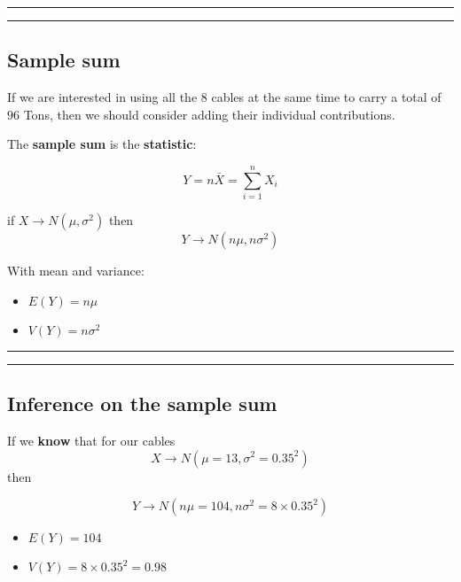 \documentclass[
]{book}
\providecommand{\tightlist}{%
  \setlength{\itemsep}{0pt}\setlength{\parskip}{0pt}}
\begin{document}
\begin{center}\rule{0.5\linewidth}{0.5pt}\end{center}

\begin{center}\rule{0.5\linewidth}{0.5pt}\end{center}

\hypertarget{sample-sum}{%
\subsection{Sample sum}\label{sample-sum}}

If we are interested in using all the \(8\) cables at the same time to carry a total of \(96\) Tons, then we should consider adding their individual contributions.

The \textbf{sample sum} is the \textbf{statistic}:

\[Y=n \bar{X}=\sum_{i=1}^n X_i\]

if \(X \rightarrow N(\mu, \sigma^2)\) then \[Y \rightarrow N(n\mu, n\sigma^2)\]

With mean and variance:

\begin{itemize}
\tightlist
\item
  \(E(Y)=n\mu\)
\item
  \(V(Y)=n\sigma^2\)
\end{itemize}

\begin{center}\rule{0.5\linewidth}{0.5pt}\end{center}

\begin{center}\rule{0.5\linewidth}{0.5pt}\end{center}

\hypertarget{inference-on-the-sample-sum}{%
\subsection{Inference on the sample sum}\label{inference-on-the-sample-sum}}

If we \textbf{know} that for our cables \[X \rightarrow N(\mu=13, \sigma^2=0.35^2)\] then

\[Y \rightarrow N(n\mu=104, n\sigma^2=8\times 0.35^2)\]

\begin{itemize}
\tightlist
\item
  \(E(Y)=104\)
\item
  \(V(Y)=8\times 0.35^2=0.98\)
\end{itemize}
\end{document}
